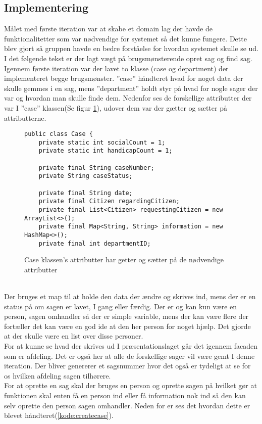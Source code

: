 \subsection{Implementering}
Målet med første iteration var at skabe et domain lag der havde de funktionalitetter som var nødvendige for systemet så det kunne fungere. Dette blev gjort så gruppen havde en bedre forståelse for hvordan systemet skulle se ud. I det følgende tekst er der lagt vægt på brugsmønsterende opret sag og find sag. Igennem første iteration var der lavet to klasse (case og department) der implementeret begge brugsmønster. ”case” håndteret hvad for noget data der skulle gemmes i en sag, mens ”department” holdt styr på hvad for nogle sager der var og hvordan man skulle finde dem.  Nedenfor ses de forskellige attributter der var I ”case” klassen(Se figur \ref{kode:caseatt}), udover dem var der gætter og sætter på attributterne. 
\begin{figure}[h]
\begin{lstlisting}
public class Case {
    private static int socialCount = 1;
    private static int handicapCount = 1;

    private final String caseNumber;
    private String caseStatus;

    private final String date;
    private final Citizen regardingCitizen;
    private final List<Citizen> requestingCitizen = new ArrayList<>();
    private final Map<String, String> information = new HashMap<>();
    private final int departmentID;
\end{lstlisting}
\caption{Case klassen's attributter har getter og sætter på de nødvendige attributter}
\label{kode:caseatt}
\end{figure}\\
Der bruges et map til at holde den data der ændre og skrives ind, mens der er en status på om sagen er lavet, I gang eller færdig. Der er og kan kun være en person, sagen omhandler så der er simple variable, mens der kan være flere der fortæller det kan være en god ide at den her person for noget hjælp. Det gjorde at der skulle være en list over disse personer. \\
For at kunne se hvad der skrives ud I præsentationslaget går det igennem facaden som er afdeling. Det er også her at alle de forskellige sager vil være gemt I denne iteration. Der bliver genererer et sagsnummer hvor det også er tydeligt at se for os hvilken afdeling sagen tilhørere. \\ 
For at oprette en sag skal der bruges en person og oprette sagen på hvilket gør at funktionen skal enten få en person ind eller få information nok ind så den kan selv oprette den person sagen omhandler. Neden for er ses det hvordan dette er blevet håndteret(\ref{kode:createcase}). \\
